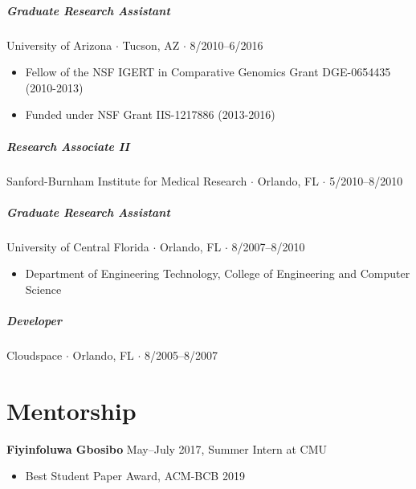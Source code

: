 \documentclass[10pt,letterpaper]{article}
\newcommand{\bigdot}{$\cdot$\xspace}
\begin{document}
\subparagraph{Graduate Research Assistant}
University of Arizona \bigdot Tucson, AZ \bigdot 8/2010--6/2016 
\begin{itemize}
    \item Fellow of the NSF IGERT in Comparative Genomics Grant DGE-0654435 (2010-2013)
    \item Funded under NSF Grant IIS-1217886 (2013-2016)
\end{itemize}

\subparagraph{Research Associate II}
Sanford-Burnham Institute for Medical Research \bigdot Orlando, FL \bigdot 5/2010--8/2010 

\subparagraph{Graduate Research Assistant}
University of Central Florida \bigdot Orlando, FL \bigdot 8/2007--8/2010 
\begin{itemize}
    \item Department of Engineering Technology, College of Engineering and Computer Science
\end{itemize}

\subparagraph{Developer}
Cloudspace \bigdot Orlando, FL \bigdot 8/2005--8/2007 

\section*{Mentorship}
\hspace{1.5em}\textbf{Fiyinfoluwa Gbosibo} May--July 2017, Summer Intern at CMU
\begin{itemize}
\item Best Student Paper Award, ACM-BCB 2019
\end{itemize}
\end{document}
